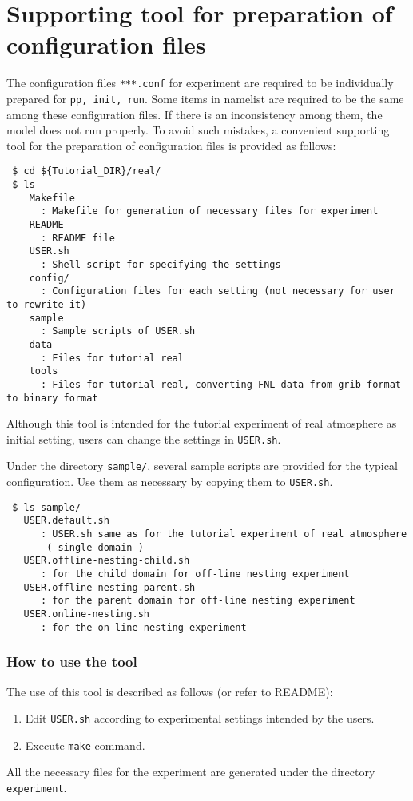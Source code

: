 \section{Supporting tool for preparation of configuration files} \label{sec:basic_makeconf}

The configuration files \verb|***.conf| for experiment are required to be individually prepared for \verb|pp, init, run|. Some items in namelist are required to be the same among these configuration files. If there is an inconsistency among them, the model does not run properly. To avoid such mistakes, a convenient supporting tool for the preparation of configuration files is provided as follows:
\begin{verbatim}
 $ cd ${Tutorial_DIR}/real/
 $ ls
    Makefile 
      : Makefile for generation of necessary files for experiment
    README
      : README file
    USER.sh
      : Shell script for specifying the settings
    config/  
      : Configuration files for each setting (not necessary for user to rewrite it)
    sample
      : Sample scripts of USER.sh
    data
      : Files for tutorial real
    tools
      : Files for tutorial real, converting FNL data from grib format to binary format
\end{verbatim}
Although this tool is intended for the tutorial experiment of real atmosphere as initial setting, users can change the settings in \verb|USER.sh|.

Under the directory \verb|sample/|, several sample scripts are provided for the typical configuration. Use them as necessary by copying them to \verb|USER.sh|.
\begin{verbatim}
 $ ls sample/
   USER.default.sh                 
      : USER.sh same as for the tutorial experiment of real atmosphere
       ( single domain )
   USER.offline-nesting-child.sh   
      : for the child domain for off-line nesting experiment
   USER.offline-nesting-parent.sh  
      : for the parent domain for off-line nesting experiment
   USER.online-nesting.sh
      : for the on-line nesting experiment
\end{verbatim}


\subsubsection{How to use the tool}

The use of this tool is described as follows (or refer to README):
\begin{enumerate}
  \item Edit \verb|USER.sh| according to experimental settings intended by the users.
  \item Execute \verb|make| command.
\end{enumerate}
 All the necessary files for the experiment are generated under the directory \verb|experiment|.

